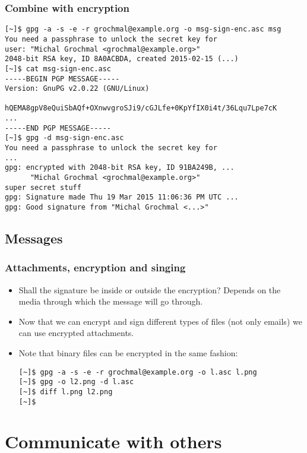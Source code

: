 \documentclass[hyperref={colorlinks=true}]{beamer}
\begin{document}
\begin{frame}[fragile]\frametitle{Combine with encryption}
{\scriptsize
\begin{verbatim}
[~]$ gpg -a -s -e -r grochmal@example.org -o msg-sign-enc.asc msg
You need a passphrase to unlock the secret key for
user: "Michal Grochmal <grochmal@example.org>"
2048-bit RSA key, ID 8A0ACBDA, created 2015-02-15 (...)
[~]$ cat msg-sign-enc.asc
-----BEGIN PGP MESSAGE-----
Version: GnuPG v2.0.22 (GNU/Linux)

hQEMA8gpV8eQuiSbAQf+OXnwvgroSJi9/cGJLfe+0KpYfIX0i4t/36Lqu7Lpe7cK
...
-----END PGP MESSAGE-----
[~]$ gpg -d msg-sign-enc.asc
You need a passphrase to unlock the secret key for
...
gpg: encrypted with 2048-bit RSA key, ID 91BA249B, ...
      "Michal Grochmal <grochmal@example.org>"
super secret stuff
gpg: Signature made Thu 19 Mar 2015 11:06:36 PM UTC ...
gpg: Good signature from "Michal Grochmal <...>"
\end{verbatim}
}
\end{frame}

\subsection{Messages}
\begin{frame}[fragile]\frametitle{Attachments, encryption and singing}
  \begin{itemize}
    \item Shall the signature be inside or outside the encryption?  Depends on
the media through which the message will go through.
    \item Now that we can encrypt and sign different types of files (not only
emails) we can use encrypted attachments.
    \item Note that binary files can be encrypted in the same fashion:
{\footnotesize
\begin{verbatim}
[~]$ gpg -a -s -e -r grochmal@example.org -o l.asc l.png
[~]$ gpg -o l2.png -d l.asc
[~]$ diff l.png l2.png
[~]$
\end{verbatim}
}
  \end{itemize}
\end{frame}

\section{Communicate with others}
\end{document}
